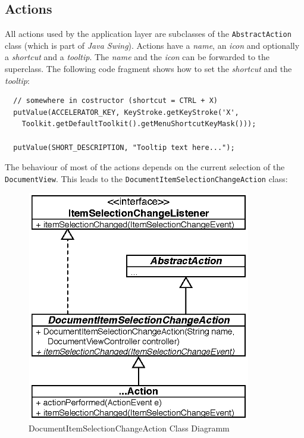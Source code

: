 %

\subsection{Actions}
All actions used by the application layer are subclasses of the \texttt{Abstract\-Action} class (which is part of \emph{Java Swing}). Actions have a \emph{name}, an \emph{icon} and optionally a \emph{shortcut} and a \emph{tooltip}. The \emph{name} and the \emph{icon} can be forwarded to the superclass. The following code fragment shows how to set the \emph{shortcut} and the \emph{tooltip}:

\begin{verbatim}
  // somewhere in costructor (shortcut = CTRL + X)
  putValue(ACCELERATOR_KEY, KeyStroke.getKeyStroke('X',
    Toolkit.getDefaultToolkit().getMenuShortcutKeyMask()));

  putValue(SHORT_DESCRIPTION, "Tooltip text here...");
\end{verbatim}

The behaviour of most of the actions depends on the current selection of the \texttt{Document\-View}. This leads to the \texttt{Document\-Item\-Selection\-Change\-Action} class:

\begin{figure}[H]
\begin{center}
  \includegraphics[height=3.97in, width=3.85in]{../images/finalreport/application_action.eps}
\caption{DocumentItemSelectionChangeAction Class Diagramm}
\label{application_application_action}
\end{center}
\end{figure}

